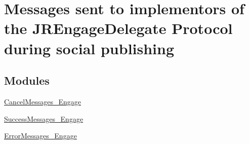 \hypertarget{group___social_publishing_messages}{
\section{Messages sent to implementors of the JREngageDelegate Protocol during social publishing}
\label{group___social_publishing_messages}
}
\subsection*{Modules}
\begin{DoxyCompactItemize}
\item 
\hyperlink{group___cancel_messages___engage}{CancelMessages\_\-Engage}
\item 
\hyperlink{group___success_messages___engage}{SuccessMessages\_\-Engage}
\item 
\hyperlink{group___error_messages___engage}{ErrorMessages\_\-Engage}
\end{DoxyCompactItemize}
